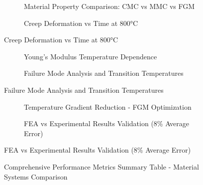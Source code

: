 \documentclass[10pt,conference]{IEEEtran}
\begin{document}
\begin{figure}[h!]
\centering
\begin{subfigure}[b]{0.48\textwidth}
    \centering
    \fbox{\rule{0pt}{2.5cm}\rule{4.5cm}{0pt}}
    \caption{Material Property Comparison: CMC vs MMC vs FGM}
    \label{fig:material_comparison}
\end{subfigure}
\hfill
\begin{subfigure}[b]{0.48\textwidth}
    \centering
    \fbox{\rule{0pt}{2.5cm}\rule{4.5cm}{0pt}}
    \caption{Creep Deformation vs Time at 800°C}
    \label{fig:creep_analysis}
\end{subfigure}
\end{figure}

\begin{figure}[h!]
\centering
\begin{subfigure}[b]{0.48\textwidth}
    \centering
    \fbox{\rule{0pt}{2.5cm}\rule{4.5cm}{0pt}}
    \caption{Young's Modulus Temperature Dependence}
    \label{fig:youngs_mod}
\end{subfigure}
\hfill
\begin{subfigure}[b]{0.48\textwidth}
    \centering
    \fbox{\rule{0pt}{2.5cm}\rule{4.5cm}{0pt}}
    \caption{Failure Mode Analysis and Transition Temperatures}
    \label{fig:failure_modes}
\end{subfigure}
\end{figure}

\begin{figure}[h!]
\centering
\begin{subfigure}[b]{0.48\textwidth}
    \centering
    \fbox{\rule{0pt}{2.5cm}\rule{4.5cm}{0pt}}
    \caption{Temperature Gradient Reduction - FGM Optimization}
    \label{fig:temp_gradient}
\end{subfigure}
\hfill
\begin{subfigure}[b]{0.48\textwidth}
    \centering
    \fbox{\rule{0pt}{2.5cm}\rule{4.5cm}{0pt}}
    \caption{FEA vs Experimental Results Validation (8\% Average Error)}
    \label{fig:validation}
\end{subfigure}
\end{figure}

\begin{figure}[h!]
\centering
\fbox{\rule{0pt}{3cm}\rule{6cm}{0pt}}
\caption{Comprehensive Performance Metrics Summary Table - Material Systems Comparison}
\label{fig:table_summary}
\end{figure}
\end{document}

